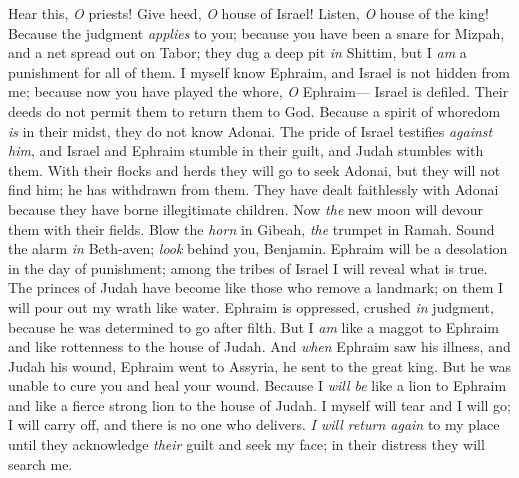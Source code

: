 \begin{biblechapter} %
 Hear this, \textit{O} priests! 
Give heed, \textit{O} house of Israel! 
Listen, \textit{O} house of the king! 
Because the judgment \textit{applies} to you; 
because you have been a snare for Mizpah, 
and a net spread out on Tabor;
\verse they dug a deep pit \textit{in} Shittim, 
but I \textit{am} a punishment for all of them.
\verse I myself know Ephraim, 
and Israel is not hidden from me; 
because now you have played the whore, \textit{O} Ephraim— 
Israel is defiled.
\verse Their deeds do not permit them 
to return them to God. 
Because a spirit of whoredom \textit{is} in their midst, 
they do not know Adonai.
\verse The pride of Israel testifies \textit{against him}, 
and Israel and Ephraim stumble in their guilt, 
and Judah stumbles with them.
\verse With their flocks and herds they will go 
to seek Adonai, but they will not find him; 
he has withdrawn from them.
\verse They have dealt faithlessly with Adonai 
because they have borne illegitimate children. 
Now \textit{the} new moon will devour them with their fields.
\verse Blow the \textit{horn} in Gibeah, 
\textit{the} trumpet in Ramah. 
Sound the alarm \textit{in} Beth-aven; 
\textit{look} behind you, Benjamin.
\verse Ephraim will be a desolation 
in the day of punishment; 
among the tribes of Israel 
I will reveal what is true.
\verse The princes of Judah have become 
like those who remove a landmark; 
on them I will pour out 
my wrath like water.
\verse Ephraim is oppressed, 
crushed \textit{in} judgment, 
because he was determined 
to go after filth.
\verse But I \textit{am} like a maggot to Ephraim 
and like rottenness to the house of Judah.
\verse And \textit{when} Ephraim saw his illness, 
and Judah his wound, 
Ephraim went to Assyria, 
he sent to the great king. 
But he was unable to cure you 
and heal your wound.
\verse Because I \textit{will be} like a lion to Ephraim 
and like a fierce strong lion to the house of Judah. 
I myself will tear and I will go; 
I will carry off, and there is no one who delivers.
\verse \textit{I will return again} to my place 
until they acknowledge \textit{their} guilt 
and seek my face; 
in their distress they will search me.
\end{biblechapter}

